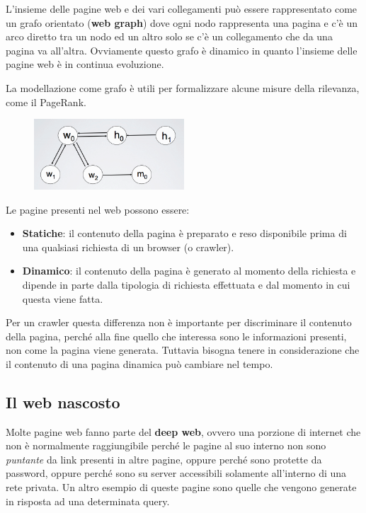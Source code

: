L'insieme delle pagine web e dei vari collegamenti può essere rappresentato come un grafo orientato (\textbf{web graph}) dove ogni nodo rappresenta una pagina e c'è un arco diretto tra un nodo ed un altro solo se c'è un collegamento che da una pagina va all'altra.
Ovviamente questo grafo è dinamico in quanto l'insieme delle pagine web è in continua evoluzione.

La modellazione come grafo è utili per formalizzare alcune misure della rilevanza, come il PageRank.

\begin{figure}[htbp]
	\centering
	\includegraphics[width = 0.5\textwidth]{images/l17-fig-3}
\end{figure}

Le pagine presenti nel web possono essere:

\begin{itemize}
	\item \textbf{Statiche}: il contenuto della pagina è preparato e reso disponibile prima di una qualsiasi richiesta di un browser (o crawler).
	\item \textbf{Dinamico}: il contenuto della pagina è generato al momento della richiesta e dipende in parte dalla tipologia di richiesta effettuata e dal momento in cui questa viene fatta.
\end{itemize}

Per un crawler questa differenza non è importante per discriminare il contenuto della pagina, perché alla fine quello che interessa sono le informazioni presenti, non come la pagina viene generata.
Tuttavia bisogna tenere in considerazione che il contenuto di una pagina dinamica può cambiare nel tempo.

\subsection{Il web nascosto}

Molte pagine web fanno parte del \textbf{deep web}, ovvero una porzione di internet che non è normalmente raggiungibile perché le pagine al suo interno non sono \textit{puntante} da link presenti in altre pagine, oppure perché sono protette da password, oppure perché sono su server accessibili solamente all'interno di una rete privata. Un altro esempio di queste pagine sono quelle che vengono generate in risposta ad una determinata query.


